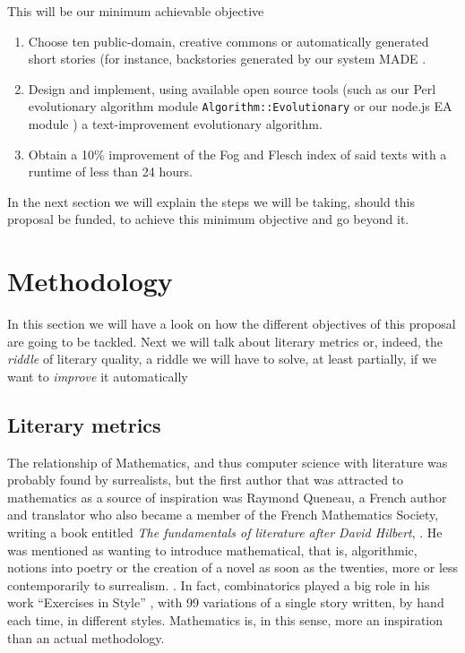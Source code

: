 \documentclass[a4paper,12pt,twocolumn]{article}
\begin{document}
This will be our minimum achievable objective\begin{enumerate}
\item Choose ten public-domain, creative commons or automatically
  generated short stories (for instance, backstories generated by our
  system MADE \cite{2014arXiv1403.3084G}.
\item Design and implement, using available open source tools (such as our Perl
  evolutionary algorithm module {\tt Algorithm::Evolutionary}
  \cite{ae09} or our node.js EA module \cite{nodeo2014}) a
  text-improvement evolutionary algorithm. 
\item Obtain a 10\% improvement of the Fog and Flesch index of said
  texts with a runtime of less than 24 hours. 
\end{enumerate}

In the next section we will explain the steps we will be taking,
should this proposal be funded, to
achieve this minimum objective and go beyond it. 

\section{Methodology}
\label{sec:meth}

In this section we will have a look on how the different objectives of
this proposal are going to be tackled. Next we will talk about
literary metrics or, indeed, the {\em riddle} of literary quality, a
riddle we will have to solve, at least partially, if we want to {\em
  improve} it automatically

\subsection{Literary metrics}

The relationship of Mathematics, and thus computer science with
literature was probably found by surrealists, but the first author
that was attracted to mathematics as a source of inspiration was
Raymond Queneau, a French author and translator who also became a
member of the French Mathematics Society, writing a book entitled {\em
  The fundamentals of literature after David Hilbert},
\cite{queneau1976fondements}. He was mentioned as wanting to introduce
mathematical, that is, algorithmic, notions into poetry or the creation
of a novel as soon as the twenties, more or less contemporarily to
surrealism. \cite{emmer2005mathematics}. In fact, combinatorics played
a big role in his work ``Exercises in Style''
\cite{queneau2013exercises}, with 99 variations of a single story
written, by hand each time, in different styles. Mathematics is, in
this sense, more an inspiration than an actual methodology. 
\end{document}
